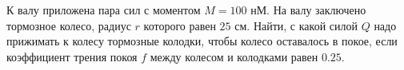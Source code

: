 К валу приложена пара сил с моментом $M=100$ нМ. На валу заключено
тормозное колесо, радиус $r$ которого равен $25$ см. Найти, с какой
силой $Q$ надо прижимать к колесу тормозные колодки, чтобы колесо
оставалось в покое, если коэффициент трения покоя $f$ между колесом и
колодками равен $0.25$.

